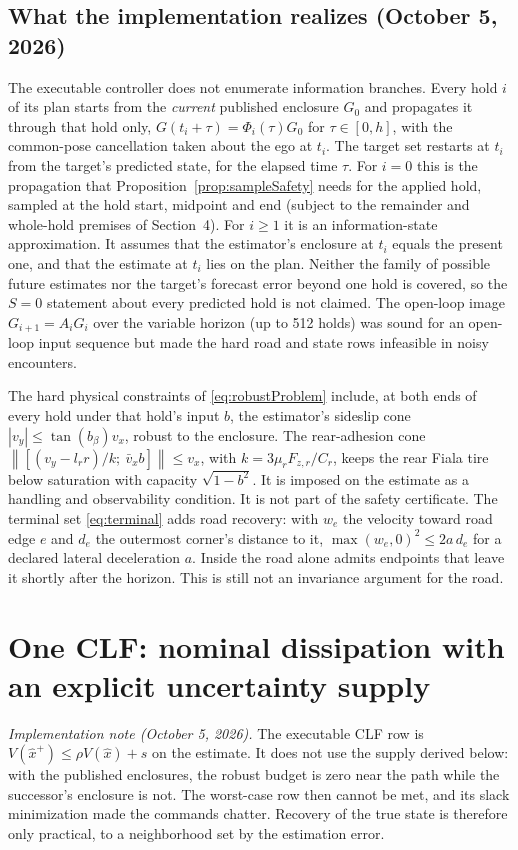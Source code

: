 \documentclass[10pt,letterpaper]{article}
\newcommand{\norm}[1]{\left\lVert#1\right\rVert}
\begin{document}
\subsection{What the implementation realizes (October 5, 2026)}
The executable controller does not enumerate information branches. Every hold
$i$ of its plan starts from the \emph{current} published enclosure $G_0$ and
propagates it through that hold only, $G(t_i+\tau)=\Phi_i(\tau)G_0$ for
$\tau\in[0,h]$, with the common-pose cancellation taken about the ego at $t_i$.
The target set restarts at $t_i$ from the target's predicted state, for the
elapsed time $\tau$. For $i=0$ this is the propagation that
Proposition~\ref{prop:sampleSafety} needs for the applied hold, sampled at the
hold start, midpoint and end (subject to the remainder and whole-hold premises
of Section~4). For $i\ge1$ it is an information-state approximation. It
assumes that the estimator's enclosure at $t_i$ equals the present one, and
that the estimate at $t_i$ lies on the plan. Neither the family of possible
future estimates nor the target's forecast error beyond one hold is covered,
so the $S=0$ statement about every predicted hold is not claimed. The
open-loop image $G_{i+1}=A_iG_i$ over the variable horizon (up to 512 holds)
was sound for an open-loop input sequence but made the hard road and state
rows infeasible in noisy encounters.

The hard physical constraints of \eqref{eq:robustProblem} include, at both
ends of every hold under that hold's input $b$, the estimator's sideslip cone
$|v_y|\le\tan(b_\beta)v_x$, robust to the enclosure. The rear-adhesion cone
$\norm{[(v_y-l_rr)/k;\ \bar v_xb]}\le v_x$, with $k=3\mu_rF_{z,r}/C_r$, keeps
the rear Fiala tire below saturation with capacity $\sqrt{1-b^2}$. It is
imposed on the estimate as a handling and observability condition. It is not
part of the safety certificate. The
terminal set \eqref{eq:terminal} adds road recovery: with $w_e$ the velocity
toward road edge $e$ and $d_e$ the outermost corner's distance to it,
$\max(w_e,0)^2\le2a\,d_e$ for a declared lateral deceleration $a$. Inside the road
alone admits endpoints that leave it shortly after the horizon. This is still
not an invariance argument for the road.

\section{One CLF: nominal dissipation with an explicit uncertainty supply}
\emph{Implementation note (October 5, 2026).} The executable CLF row is
$V(\hat x^+)\le\rho V(\hat x)+s$ on the estimate. It does not use the supply
derived below: with the published enclosures, the robust budget is zero near
the path while the successor's enclosure is not. The worst-case row then
cannot be met, and its slack minimization made the commands chatter. Recovery
of the true state is therefore only practical, to a neighborhood set by the
estimation error.
\end{document}
